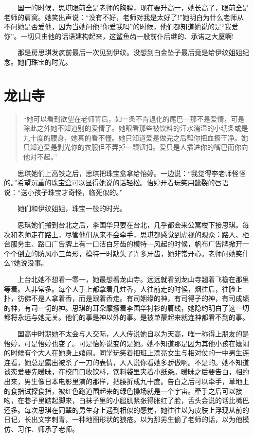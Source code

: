 \documentclass[12pt,UTF8]{ctexbook}
\begin{document}
　　国一的时候，思琪眼前全是老师的胸膛，现在要升高一，她长高了，眼前全是老师的肩窝。她笑出声说：\enquote{没有不好，老师对我是太好了!}她明白为什么老师从不问她是否爱他，因为当她问他\enquote{你爱我吗}的时候，他们都知道她说的是\enquote{我爱你}。一切只由他的话语建构起来，这鲨鱼齿一般前仆后继的、承诺之大厦啊!

　　那是房思琪发疯前最后一次见到伊纹。没想到白金坠子最后竟是给伊纹姐姐纪念。她们珠宝的时光。

\hypertarget{ux9f99ux5c71ux5bfa}{%
\section*{龙山寺}\label{ux9f99ux5c71ux5bfa}}

\begin{quote}
\enquote{她可以看到欲望在老师背后，如一条不肯退化的尾巴---那不是爱情，可是除此之外她不知道别的爱情了。她眼看那些被饮料的汗水濡湿的小纸条或是九十度的腰身，她真的看不懂。她只知道爱是做完之后帮你把血擦干净。她只知道爱是剥光你的衣服但不弄掉一颗钮扣。爱只是人插进你的嘴巴而你向他对不起。}
\end{quote}

　　思琪她们上高铁之后，思琪把珠宝盒拿给怡婷。一边说：\enquote{我觉得李老师怪怪的。}希望沉重的珠宝盒可以显得她说的话轻松。怡婷开着玩笑用龇裂的唇语说：\enquote{送小孩子珠宝才奇怪，临死似的。}

　　她们和伊纹姐姐，珠宝一般的时光。

　　思琪她们搬到台北之后，李国华只要在台北，几乎都会来公寓楼下接思琪。每次和老师走在路上，尽管他们从来不会牵手，思琪都感觉到虎视的观众：路人、柜台服务生、路口广告牌上有一口洁白牙齿的模特---风起的时候，帆布广告牌掀开一个个倒立的防风小三角形，模特一时缺失了许多牙齿，她非常开心。老师问她笑什么?她说没事。

　　上台北她不想看一零一，她最想看龙山寺。远远就看到龙山寺翘着飞檐在那里等着。人非常多。每个人手上都拿着几炷香，人往前走的时候，烟往后，往脸上扑，彷佛不是人拿着香，而是跟着香走。有司姻缘的神，有司得子的神，有司成绩的神，有司一切的神。思琪的耳朵摩擦着李国华衬衫的肩线，她隐约明白了这一切都将永远与她无关。他们的事是神以外的事。是被单蒙起来就连神都看不到的事。

　　国高中时期她不太会与人交际，人人传说她自以为天高，唯一称得上朋友的是怡婷，可是怡婷也变了。可是怡婷说变的是她。她不知道那是因为其他小孩在嬉闹的时候有个大人在她身上嬉闹。同学玩笑着把班上漂亮女生与相对仗的一中男生连连看，她总是露出被杀了一刀的表情，人人说你看她多骄傲啊。不是的。她不知道谈恋爱要先暧昧，在校门口收饮料，饮料袋里夹着小纸条。暧昧之后要告白，相约出来，男生像日本电影里演的那样，把腰折成九十度。告白之后可以牵手，草地上的食指试探食指，被红色跑道围起来的绿色操场就是一个宇宙。牵手之后可以接吻，在巷子里踮起脚来，白袜子里的小腿肌紧张得胀红了脸，舌头会说的话比嘴巴还多。每次思琪在同辈的男生身上遇到相似的感觉，她往往以为皮肤上浮现从前的日记，长出文字刺青，一种地图形状的狼疮。以为那男生偷了老师的话，以为他模仿、习作、师承了老师。
\end{document}
